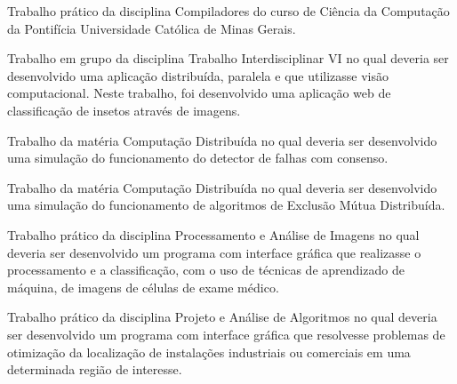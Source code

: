 
Trabalho prático da disciplina Compiladores do curso de Ciência da Computação da Pontifícia Universidade Católica de Minas Gerais.\\
\divider

Trabalho em grupo da disciplina Trabalho Interdisciplinar VI no qual deveria ser desenvolvido uma aplicação distribuída, paralela e que utilizasse visão computacional. Neste trabalho, foi desenvolvido uma aplicação web de classificação de insetos através de imagens.\\
\divider

Trabalho da matéria Computação Distribuída no qual deveria ser desenvolvido uma simulação do funcionamento do detector de falhas com consenso.\\
\divider

Trabalho da matéria Computação Distribuída no qual deveria ser desenvolvido uma simulação do funcionamento de algoritmos de Exclusão Mútua Distribuída.\\
\divider

Trabalho prático da disciplina Processamento e Análise de Imagens no qual deveria ser desenvolvido um programa com interface gráfica que realizasse o processamento e a classificação, com o uso de técnicas de aprendizado de máquina, de imagens de células de exame médico.\\
\divider

Trabalho prático da disciplina Projeto e Análise de Algoritmos no qual deveria ser desenvolvido um programa com interface gráfica que resolvesse problemas de otimização da localização de instalações industriais ou comerciais em uma determinada região de interesse.\\
\divider

